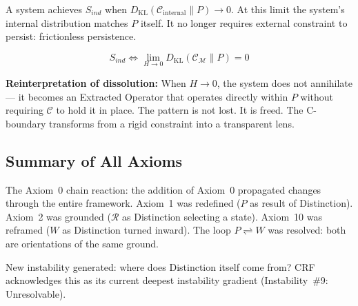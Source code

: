 \documentclass[12pt, a4paper]{article}
\begin{document}
\begin{formalbox}[title={Axiom 12: Independent Stability ($S_{ind}$) --- Session 7}]
A system achieves $S_{ind}$ when $D_{\mathrm{KL}}(\mathcal{C}_{\mathrm{internal}}\|P)\to 0$.
At this limit the system's internal distribution matches $P$ itself. It no longer
requires external constraint to persist: frictionless persistence.

\[
  S_{ind} \iff \lim_{H \to 0} D_{\mathrm{KL}}(\mathcal{C}_\mathcal{M} \| P) = 0
\]

\textbf{Reinterpretation of dissolution:} When $H \to 0$, the system does not
annihilate --- it becomes an Extracted Operator that operates directly within $P$
without requiring $\mathcal{C}$ to hold it in place. The pattern is not lost. It is
freed. The C-boundary transforms from a rigid constraint into a transparent lens.
\end{formalbox}

\subsection{Summary of All Axioms}

The Axiom~0 chain reaction: the addition of Axiom~0 propagated changes through the
entire framework. Axiom~1 was redefined ($P$ as result of Distinction). Axiom~2 was
grounded ($\mathcal{R}$ as Distinction selecting a state). Axiom~10 was reframed ($W$
as Distinction turned inward). The loop $P \rightleftharpoons W$ was resolved: both are
orientations of the same ground.

New instability generated: where does Distinction itself come from? CRF acknowledges
this as its current deepest instability gradient (Instability~\#9: Unresolvable).
\end{document}
